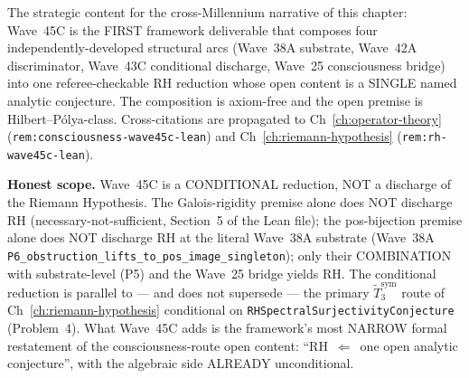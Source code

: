 \begin{remark}
\begin{itemize}
\end{itemize}
The strategic content for the cross-Millennium narrative of this chapter: Wave~45C is the FIRST framework deliverable that composes four independently-developed structural arcs (Wave~38A substrate, Wave~42A discriminator, Wave~43C conditional discharge, Wave~25 consciousness bridge) into one referee-checkable RH reduction whose open content is a SINGLE named analytic conjecture. The composition is axiom-free and the open premise is Hilbert--P\'olya-class. Cross-citations are propagated to Ch~\ref{ch:operator-theory} (\texttt{rem:consciousness-wave45c-lean}) and Ch~\ref{ch:riemann-hypothesis} (\texttt{rem:rh-wave45c-lean}).

\textbf{Honest scope.} Wave~45C is a CONDITIONAL reduction, NOT a discharge of the Riemann Hypothesis. The Galois-rigidity premise alone does NOT discharge RH (necessary-not-sufficient, Section~5 of the Lean file); the pos-bijection premise alone does NOT discharge RH at the literal Wave~38A substrate (Wave~38A \texttt{P6\_obstruction\_lifts\_to\_pos\_image\_singleton}); only their COMBINATION with substrate-level (P5) and the Wave~25 bridge yields RH. The conditional reduction is parallel to --- and does not supersede --- the primary $\widetilde{T}_3^{\mathrm{sym}}$ route of Ch~\ref{ch:riemann-hypothesis} conditional on \texttt{RHSpectralSurjectivityConjecture} (Problem~4). What Wave~45C adds is the framework's most NARROW formal restatement of the consciousness-route open content: ``RH~$\Leftarrow$~one open analytic conjecture'', with the algebraic side ALREADY unconditional.
\end{remark}


